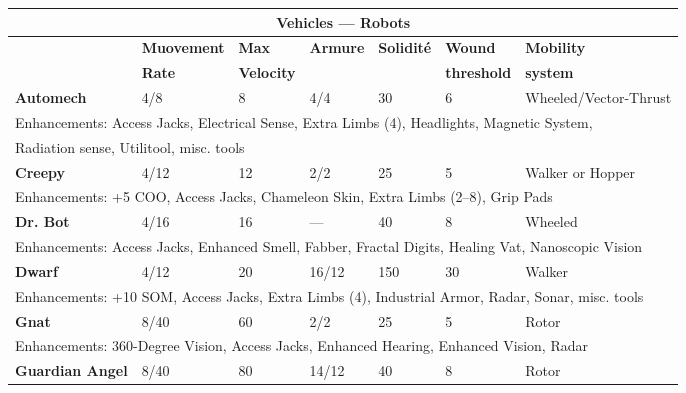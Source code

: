 \begin{table} \begin{tabular}{|l|l|l|l|l|l|l|} \hline

\multicolumn{7}{|c|}{\textbf{Vehicles --- Robots}} \\ \hline

&\textbf{Muovement}	&\textbf{Max}	&\textbf{Armure}	&\textbf{Solidité}	&\textbf{Wound}	&\textbf{Mobility} \\ &\textbf{Rate}	&\textbf{Velocity}	&&&\textbf{threshold}	&\textbf{system} \\ \hline

\textbf{Automech}	&4/8	&8	&4/4	&30	&6	&Wheeled/Vector-Thrust \\ \hline

\multicolumn{7}{|l|}{Enhancements: Access Jacks, Electrical Sense, Extra Limbs (4), Headlights, Magnetic System, } \\ \multicolumn{7}{|l|}{Radiation sense, Utilitool, misc. tools} \\ \hline

\textbf{Creepy}	&4/12	&12	&2/2	&25	&5	&Walker or Hopper \\ \hline

\multicolumn{7}{|l|}{Enhancements: +5 COO, Access Jacks, Chameleon Skin, Extra Limbs (2--8), Grip Pads} \\ \hline

\textbf{Dr. Bot}	&4/16	&16	&--- &40	&8	&Wheeled \\ \hline

\multicolumn{7}{|l|}{Enhancements: Access Jacks, Enhanced Smell, Fabber, Fractal Digits, Healing Vat, Nanoscopic Vision} \\ \hline

\textbf{Dwarf}	&4/12	&20	&16/12	&150	&30	&Walker \\ \hline

\multicolumn{7}{|l|}{Enhancements: +10 SOM, Access Jacks, Extra Limbs (4), Industrial Armor, Radar, Sonar, misc. tools} \\ \hline

\textbf{Gnat}	&8/40	&60	&2/2	&25	&5	&Rotor \\ \hline

\multicolumn{7}{|l|}{Enhancements: 360-Degree Vision, Access Jacks, Enhanced Hearing, Enhanced Vision, Radar} \\ \hline

\textbf{Guardian Angel}	&8/40	&80	&14/12	&40	&8	&Rotor \\ \hline


\end{tabular}
\end{table}
